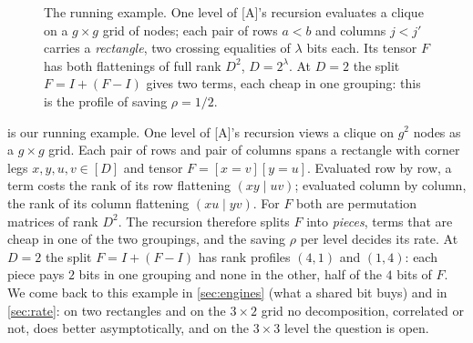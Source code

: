 \documentclass[10pt]{amsart}
\theoremstyle{plain}
\theoremstyle{definition}
\theoremstyle{remark}
\numberwithin{equation}{section}
\newcommand{\A}{\textup{[A]}}
\begin{document}
\begin{figure}[ht]
\centering
{}
\caption{The running example. One level of \A's recursion evaluates a clique on a $g\times g$ grid of
nodes; each pair of rows $a<b$ and columns $j<j'$ carries a \emph{rectangle}, two crossing equalities
of $\lambda$ bits each. Its tensor $F$ has both flattenings of full rank $D^2$, $D=2^\lambda$. At $D=2$
the split $F=I+(F-I)$ gives two terms, each cheap in one grouping: this is the profile of saving
$\rho=1/2$.}\label{fig:rect}
\end{figure}

 is our running example. One level of \A's recursion views a clique on $g^2$ nodes as
a $g\times g$ grid. Each pair of rows and pair of columns spans a rectangle with corner legs
$x,y,u,v\in[D]$ and tensor $F=[x=v][y=u]$. Evaluated row by row, a term costs the rank of its row
flattening $(xy\mid uv)$; evaluated column by column, the rank of its column flattening
$(xu\mid yv)$. For $F$ both are permutation matrices of rank $D^2$. The recursion therefore splits $F$
into \emph{pieces}, terms that are cheap in one of the two groupings, and the saving $\rho$ per level
decides its rate. At $D=2$ the split $F=I+(F-I)$ has rank profiles $(4,1)$ and $(1,4)$: each piece
pays $2$ bits in one grouping and none in the other, half of the $4$ bits of $F$. We come back to this
example in \cref{sec:engines} (what a shared bit buys) and in \cref{sec:rate}: on two rectangles and on
the $3\times2$ grid no decomposition, correlated or not, does better asymptotically, and on the
$3\times3$ level the question is open.
\end{document}
